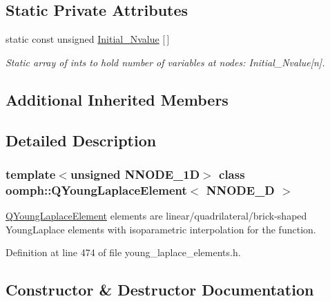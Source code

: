\subsection*{Static Private Attributes}
\begin{DoxyCompactItemize}
\item 
static const unsigned \hyperlink{classoomph_1_1QYoungLaplaceElement_a88a7038a816787a6626bca44e82ad40d}{Initial\+\_\+\+Nvalue} \mbox{[}$\,$\mbox{]}
\begin{DoxyCompactList}\small\item\em Static array of ints to hold number of variables at nodes\+: Initial\+\_\+\+Nvalue\mbox{[}n\mbox{]}. \end{DoxyCompactList}\end{DoxyCompactItemize}
\subsection*{Additional Inherited Members}


\subsection{Detailed Description}
\subsubsection*{template$<$unsigned N\+N\+O\+D\+E\+\_\+1D$>$\newline
class oomph\+::\+Q\+Young\+Laplace\+Element$<$ N\+N\+O\+D\+E\+\_\+D $>$}

\hyperlink{classoomph_1_1QYoungLaplaceElement}{Q\+Young\+Laplace\+Element} elements are linear/quadrilateral/brick-\/shaped Young\+Laplace elements with isoparametric interpolation for the function. 

Definition at line 474 of file young\+\_\+laplace\+\_\+elements.\+h.



\subsection{Constructor \& Destructor Documentation}
\mbox{\label{classoomph_1_1QYoungLaplaceElement_a055701cd6bf5e26c96e8ef560309dbb4}} 
